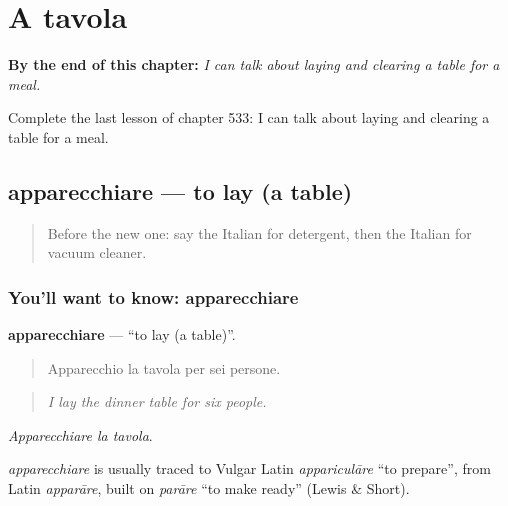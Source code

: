 
\chapter{A tavola}
\label{ch:it-a-tavola}

\begin{chapteropening}
\textbf{By the end of this chapter:} \emph{I can talk about laying and clearing a table for a meal.}

Complete the last lesson of chapter 533: I can talk about laying and clearing a table for a meal.
\end{chapteropening}

\section[apparecchiare]{apparecchiare — to lay (a table)}

\label{lesson:IT-C533-apparecchiare}



\begin{quote}
Before the new one: say the Italian for detergent, then the Italian for vacuum cleaner.
\end{quote}

\subsection*{You'll want to know: apparecchiare}
\textbf{apparecchiare} — \textquotedblleft{}to lay (a table)\textquotedblright{}.

\begin{quote}
Apparecchio la tavola per sei persone.
\end{quote}

\begin{quote}
\emph{I lay the dinner table for six people.}
\end{quote}

\emph{Apparecchiare la tavola}.

\begin{cousinweb}
\emph{apparecchiare} is usually traced to Vulgar Latin \emph{appariculāre} \textquotedblleft{}to prepare\textquotedblright{}, from Latin \emph{apparāre}, built on \emph{parāre} \textquotedblleft{}to make ready\textquotedblright{} (Lewis \& Short).
\end{cousinweb}

